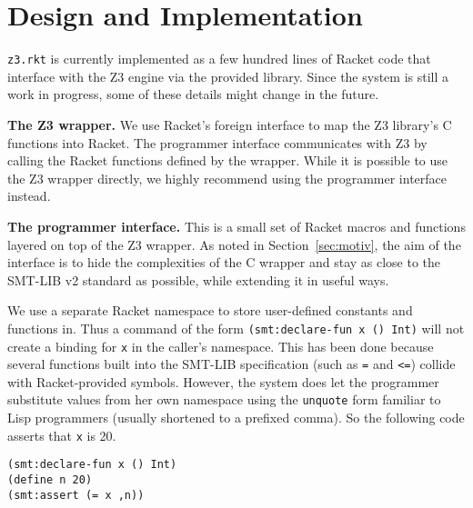 \section{Design and Implementation}

\texttt{z3.rkt} is currently implemented as a few hundred lines of Racket code
that interface with the Z3 engine via the provided library. Since the system is
still a work in progress, some of these details might change in the future.

\textbf{The Z3 wrapper.} We use Racket's foreign interface \cite{racket/foreign}
to map the Z3 library's C functions into Racket. The programmer interface
communicates with Z3 by calling the Racket functions defined by the
wrapper. While it is possible to use the Z3 wrapper directly, we highly
recommend using the programmer interface instead.

\textbf{The programmer interface.} This is a small set of Racket macros and
functions layered on top of the Z3 wrapper. As noted in Section~\ref{sec:motiv},
the aim of the interface is to hide the complexities of the C wrapper and stay
as close to the SMT-LIB v2 standard \cite{smtlib2:10} as possible, while
extending it in useful ways.

We use a separate Racket namespace to store user-defined constants and functions
in. Thus a command of the form \texttt{(smt:declare-fun x () Int)} will not
create a binding for \texttt{x} in the caller's namespace. This has been done
because several functions built into the SMT-LIB specification (such as
\texttt{=} and \texttt{<=}) collide with Racket-provided symbols. However, the
system does let the programmer substitute values from her own namespace using
the \texttt{unquote} form familiar to Lisp programmers (usually shortened to a
prefixed comma). So the following code asserts that \texttt{x} is 20.

\begin{verbatim}
(smt:declare-fun x () Int)
(define n 20)
(smt:assert (= x ,n))
\end{verbatim} 
